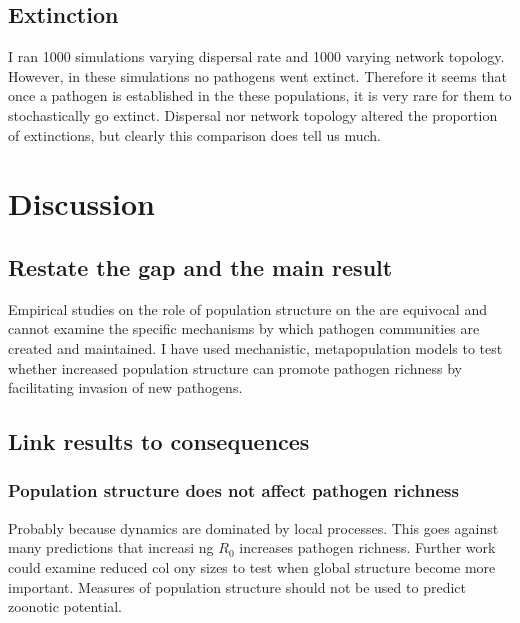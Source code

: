 \subsection{Extinction}

I ran 1000 simulations varying dispersal rate and 1000 varying network topology. 
However, in these simulations no pathogens went extinct. 
Therefore it seems that once a pathogen is established in the these populations, it is very rare for them to stochastically go extinct.
Dispersal nor network topology altered the proportion of extinctions, but clearly this comparison does tell us much.





\clearpage
\section{Discussion}


\subsection{Restate the gap and the main result}

Empirical studies on the role of population structure on the are equivocal and cannot examine the specific mechanisms by which pathogen communities are created and maintained.
I have used mechanistic, metapopulation models to test whether increased population structure can promote pathogen richness by facilitating invasion of new pathogens.



\subsection{Link results to consequences}

\subsubsection{Population structure does not affect pathogen richness}

Probably because dynamics are dominated by local processes.
This goes against many predictions that increasi  ng $R_0$ increases pathogen richness.
Further work could examine reduced col  ony sizes to test when global structure become more important.
Measures of population structure should not be used to predict zoonotic potential.

